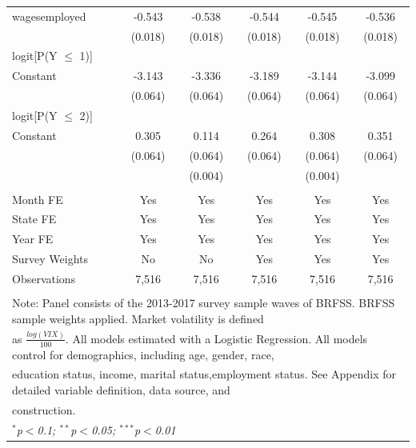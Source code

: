 \documentclass[11pt,a4paper,oldfontcommands]{memoir}
\begin{document}
{\begin{footnotesize}
\begin{tiny}
\begin{longtable}{l*{5}{c}}
wagesemployed       &      -0.543\sym{***}&      -0.538\sym{***}&      -0.544\sym{***}&      -0.545\sym{***}&      -0.536\sym{***}\\
                    &     (0.018)         &     (0.018)         &     (0.018)         &     (0.018)         &     (0.018)         \\
\hline
logit[P(Y $\leq$ 1)]                &                     &                     &                     &                     &                     \\
Constant            &      -3.143\sym{***}&      -3.336\sym{***}&      -3.189\sym{***}&      -3.144\sym{***}&      -3.099\sym{***}\\
                    &     (0.064)         &     (0.064)         &     (0.064)         &     (0.064)         &     (0.064)         \\
\hline
logit[P(Y $\leq$ 2)]                &                     &                     &                     &                     &                     \\
Constant            &       0.305\sym{***}&       0.114         &       0.264\sym{***}&       0.308\sym{***}&       0.351\sym{***}\\
                    &     (0.064)         &     (0.064)         &     (0.064)         &     (0.064)         &     (0.064)         \\
                   &                     &     (0.004)         &                     &     (0.004)         \\
\hline \\[-1.8ex] 
Month FE  & Yes & Yes & Yes & Yes & Yes \\ 
State FE  & Yes & Yes & Yes & Yes & Yes \\ 
Year FE  & Yes & Yes & Yes & Yes & Yes \\ 
Survey Weights & No & No & Yes & Yes & Yes\\ 
Observations  & 7,516 & 7,516 & 7,516 & 7,516 & 7,516 \\ 
\hline \\[-1.8ex] 
\multicolumn{6}{l}{Note: Panel consists of the 2013-2017 survey sample waves of BRFSS. BRFSS sample weights applied. Market volatility is defined}\\
\multicolumn{6}{l}{as $\frac{log(VIX)}{100}$. All models estimated with a Logistic Regression. All models control for demographics, including age, gender, race,}\\
\multicolumn{6}{l}{education status, income, marital status,employment status. See Appendix for detailed variable definition, data  source, and}\\
\multicolumn{6}{l}{construction.}\\
\multicolumn{6}{l}{ \textit{$^{*}$p$<$0.1; $^{**}$p$<$0.05; $^{***}$p$<$0.01}} \\ 
\hline\hline
\end{longtable}
\end{tiny} 



\end{footnotesize}}
\end{document}
